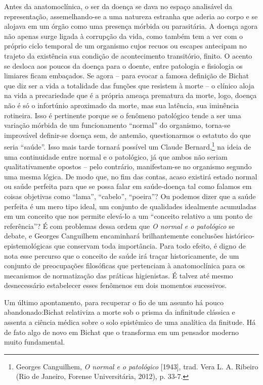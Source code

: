 Antes da anatomoclínica, o ser da doença se dava no espaço analisável da
representação, assemelhando-se a uma natureza estranha que aderia ao
corpo e se alojava em um órgão como uma presença mórbida ou parasitária.
A doença agora não apenas surge ligada à corrupção da vida, como também
tem a ver com o próprio ciclo temporal de um organismo cujos recuos ou
escapes antecipam no trajeto da existência sua condição de acontecimento
transitório, finito. O acento se desloca aos poucos da doença para o
doente, entre patologia e fisiologia os limiares ficam embaçados. Se
agora -- para evocar a famosa definição de Bichat que diz ser a vida a
totalidade das funções que resistem à morte -- o clínico aloja na vida a
precariedade que é a própria ameaça prematura da morte, logo, doença não
é só o infortúnio aproximado da morte, mas sua latência, sua iminência
rotineira. Isso é pertinente porque se o fenômeno patológico tende a ser
uma variação mórbida de um funcionamento ``normal'' do organismo,
torna-se improvável definir-se doença sem, de antemão, questionarmos o
estatuto do que seria ``saúde''. Isso mais tarde tornará possível um
Claude Bernard,\footnote{Georges Canguilhem, \emph{O normal e o
  patológico} {[}1943{]}, trad. Vera L. A. Ribeiro (Rio de Janeiro,
  Forense Universitária, 2012), p. 33-7.} na ideia de uma continuidade
entre normal e o patológico, já que ambos não seriam qualitativamente
opostos -- pelo contrário, manifestam-se no organismo segundo uma mesma
lógica. De modo que, no fim das contas, acaso existirá estado normal ou
saúde perfeita para que se possa falar em saúde-doença tal como falamos
em coisas objetivas como ``lama'', ``cabelo'', ``poeira''? Ou podemos
dizer que a saúde perfeita é um mero tipo ideal, um conjunto de
qualidades idealmente acumuladas em um conceito que nos permite elevá-lo
a um ``conceito relativo a um ponto de referência''? É com problemas
dessa ordem que \emph{O normal e o patológico} se debate, e Georges
Canguilhem encaminhará brilhantemente conclusões
histórico-epistemológicas que conservam toda importância. Para todo
efeito, é digno de nota esse percurso que o conceito de saúde irá traçar
historicamente, de um conjunto de preocupações filosóficas que
pertenciam à anatomoclínica para os mecanismos de normatização das
práticas higienistas. É talvez até mesmo desnecessário estabelecer esses
fenômenos em dois momentos sucessivos.

Um último apontamento, para recuperar o fio de um assunto há pouco
abandonado:Bichat relativiza a morte sob o prisma da infinitude clássica
e assenta a ciência médica sobre o solo epistêmico de uma analítica da
finitude. Há de fato algo de novo em Bichat que o transforma em um
pensador moderno muito fundamental.

